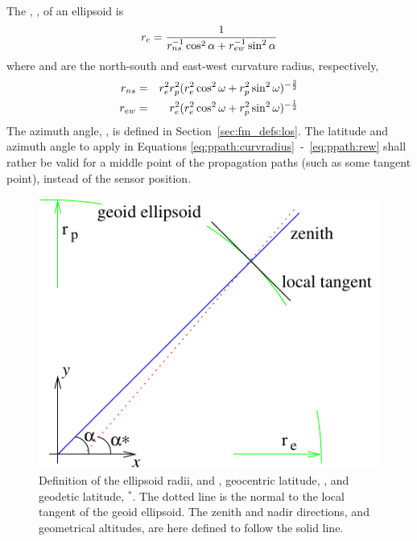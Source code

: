 The , , of an ellipsoid is 
\citep{rodgers:00}
\begin{equation}
 r_{c} = \frac{1}{r_{ns}^{-1}\cos^2 \alpha + r_{ew}^{-1}\sin^2 \alpha}
 \label{eq:ppath:curvradius} 
\end{equation}
where  and  are the north-south and east-west curvature radius, respectively,
\begin{eqnarray}
 r_{ns} &=& r_{e}^2r_{p}^2 (
           r_{e}^2\cos^2\omega+r_{p}^2\sin^2\omega )^{-\frac{3}{2}} \\
 r_{ew} &=& r_{e}^2 (
           r_{e}^2\cos^2\omega+r_{p}^2\sin^2\omega )^{-\frac{1}{2}} 
 \label{eq:ppath:rew} 
\end{eqnarray}
The azimuth angle, \AzmAng, is defined in
Section~\ref{sec:fm_defs:los}. The latitude and azimuth angle to
apply in Equations \ref{eq:ppath:curvradius}~-~\ref{eq:ppath:rew}
shall rather be valid for a middle point of the propagation paths
(such as some tangent point), instead of the sensor position. 

\begin{figure}[!p]
 \begin{center}
  \begin{minipage}[c]{0.65\textwidth}
   \begin{center}
    \includegraphics*[width=0.9\hsize]{Figs/ppath/latitudes}
   \end{center}
  \end{minipage}%
  \begin{minipage}[c]{0.35\textwidth}
   \caption{Definition of the ellipsoid radii,  and , 
     geocentric latitude, \Lat, and geodetic latitude, \Lat$^*$. The
     dotted line is the normal to the local tangent of the geoid
     ellipsoid. The zenith and nadir directions, and geometrical
     altitudes, are here defined to follow the solid line.}
   \label{fig:ppath:lats}
  \end{minipage}
 \end{center}
\end{figure}   

